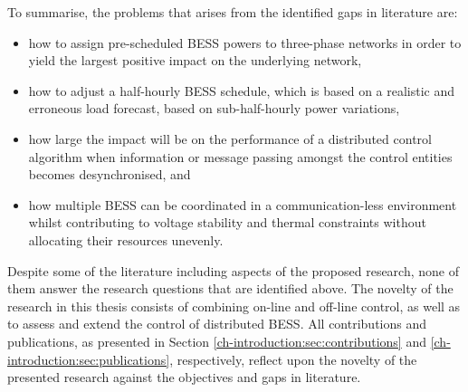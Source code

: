 To summarise, the problems that arises from the identified gaps in literature are:

\begin{itemize}
	\item how to assign pre-scheduled BESS powers to three-phase networks in order to yield the largest positive impact on the underlying network,
	\item how to adjust a half-hourly BESS schedule, which is based on a realistic and erroneous load forecast, based on sub-half-hourly power variations,
	\item how large the impact will be on the performance of a distributed control algorithm when information or message passing amongst the control entities becomes desynchronised, and
	\item how multiple BESS can be coordinated in a communication-less environment whilst contributing to voltage stability and thermal constraints without allocating their resources unevenly.
\end{itemize}

Despite some of the literature including aspects of the proposed research, none of them answer the research questions that are identified above.
The novelty of the research in this thesis consists of combining on-line and off-line control, as well as to assess and extend the control of distributed BESS.
All contributions and publications, as presented in Section \ref{ch-introduction:sec:contributions} and \ref{ch-introduction:sec:publications}, respectively, reflect upon the novelty of the presented research against the objectives and gaps in literature.
